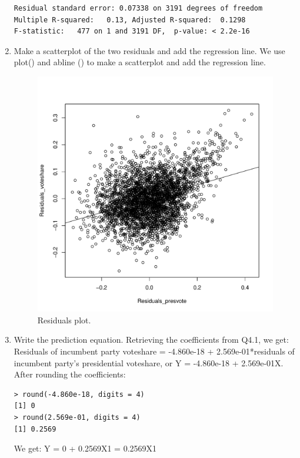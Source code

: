 \documentclass[12pt,letterpaper]{article}
\begin{document}
\begin{enumerate}
\begin{verbatim}
Residual standard error: 0.07338 on 3191 degrees of freedom
Multiple R-squared:   0.13,	Adjusted R-squared:  0.1298 
F-statistic:   477 on 1 and 3191 DF,  p-value: < 2.2e-16
\end{verbatim}
		\item Make a scatterplot of the two residuals and add the regression line. 	
\noindent We use plot() and abline () to make a scatterplot and add the regression line.\\
\vspace{5cm}
  
\vspace{.5cm}  
\begin{figure}[h!]\centering
	\caption{\footnotesize Residuals plot.}
	\label{fig:plot_10}
	\includegraphics[width=.5\textwidth]{plotres_diffpres_diffvote.pdf}
\end{figure}
		\item Write the prediction equation.
\noindent Retrieving the coefficients from Q4.1, we get: Residuals of incumbent party voteshare = -4.860e-18 + 2.569e-01*residuals of incumbent party's presidential voteshare, or Y = -4.860e-18 + 2.569e-01X.\\
\noindent After rounding the coefficients:\\
\begin{verbatim}
> round(-4.860e-18, digits = 4)
[1] 0
> round(2.569e-01, digits = 4)
[1] 0.2569
\end{verbatim}
\noindent We get: Y = 0 + 0.2569X1 = 0.2569X1\\
	\end{enumerate}
	
	\newpage	
\end{document}
